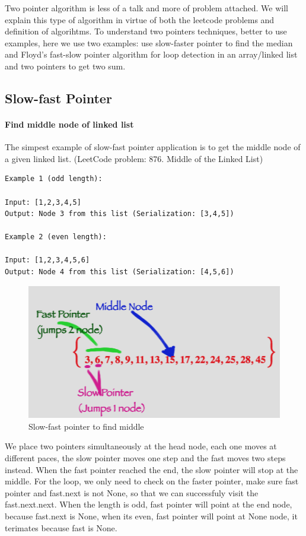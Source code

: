 \documentclass[../searching.tex]{subfiles}
\begin{document}
Two pointer algorithm is less of a talk and more of problem attached. We will explain this type of algorithm in virtue of both the leetcode problems and definition of algorihtms. 
To understand two pointers techniques, better to use examples, here we use two examples: use slow-faster pointer to find the median and Floyd's fast-slow pointer algorithm for loop detection in an array/linked list and two pointers to get two sum. 

\subsection{Slow-fast Pointer} 
\paragraph{Find middle node of linked list} The simpest example of slow-fast pointer application is to get the middle node of a given linked list. (LeetCode problem: 876. Middle of the Linked List)
\begin{lstlisting}[numbers=none]
Example 1 (odd length):

Input: [1,2,3,4,5]
Output: Node 3 from this list (Serialization: [3,4,5])

Example 2 (even length):

Input: [1,2,3,4,5,6]
Output: Node 4 from this list (Serialization: [4,5,6])
\end{lstlisting}
\begin{figure}[h]
    \centering
    \includegraphics[width = 0.8\columnwidth]{fig/middle node of a given linked list.png}
    \caption{Slow-fast pointer to find middle}
    \label{fig:slow-faster}
\end{figure}
We place two pointers simultaneously at the head node, each one moves at different paces, the slow pointer moves one step and the fast moves two steps instead. When the fast pointer reached the end, the slow pointer will stop at the middle. For the loop, we only need to check on the faster pointer, make sure fast pointer and fast.next is not None, so that we can successfuly visit the fast.next.next. When the length is odd, fast pointer will point at the end node, because fast.next is None, when its even, fast pointer will point at None node, it terimates because fast is None. 
\end{document}
